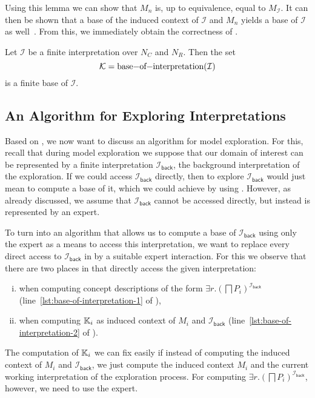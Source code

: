 Using this lemma we can show that $M_{n}$ is, up to equivalence, equal to
$M_{\mathcal{I}}$.  It can then be shown that a base of the induced context of
$\mathcal{I}$ and $M_{n}$ yields a base of $\mathcal{I}$ as
well~\cite[Corollary~5.14]{Diss-Felix}.  From this, we immediately obtain the correctness
of .

\begin{Theorem}
  \label{thm:Felix-6.9}
  Let $\mathcal{I}$ be a finite interpretation over $N_{C}$ and $N_{R}$.  Then the set
  \begin{equation*}
    \mathcal{K} = \text{\lstinline{base-of-interpretation}}(\mathcal{I})
  \end{equation*}
  is a finite base of $\mathcal{I}$.
\end{Theorem}

\subsection{An Algorithm for Exploring Interpretations}
\label{sec:an-algor-expl}

Based on , we now want to discuss an algorithm for model
exploration.  For this, recall that during model exploration we suppose that our domain of
interest can be represented by a finite interpretation $\mathcal{I}_{\mathsf{back}}$, the
background interpretation of the exploration.  If we could access
$\mathcal{I}_{\mathsf{back}}$ directly, then to explore $\mathcal{I}_{\mathsf{back}}$
would just mean to compute a base of it, which we could achieve by using
.  However, as already discussed, we assume that
$\mathcal{I}_{\mathsf{back}}$ cannot be accessed directly, but instead is represented by
an expert.

To turn  into an algorithm that allows us to compute a
base of $\mathcal{I}_{\mathsf{back}}$ using only the expert as a means to access this
interpretation, we want to replace every direct access to $\mathcal{I}_{\mathsf{back}}$ in
 by a suitable expert interaction.  For this we observe
that there are two places in  that directly access the
given interpretation:
\begin{enumerate}[i. ]
\item when computing concept descriptions of the form $\exists r.(\bigsqcap
  P_{i})^{\mathcal{I}_{\mathsf{back}}}$ (line~\ref{lst:base-of-interpretation-1} of
  ),
\item when computing ${\mathbb{K}}_{i}$ as induced context of $M_{i}$ and
  $\mathcal{I}_{\mathsf{back}}$ (line~\ref{lst:base-of-interpretation-2} of
  ).
\end{enumerate}
The computation of ${\mathbb{K}}_{i}$ we can fix easily if instead of computing the induced
context of $M_{i}$ and $\mathcal{I}_{\mathsf{back}}$, we just compute the induced context
$M_{i}$ and the current working interpretation of the exploration process.  For computing
$\exists r. (\bigsqcap P_{i})^{\mathcal{I}_{\mathsf{back}}}$, however, we need to use the
expert.

